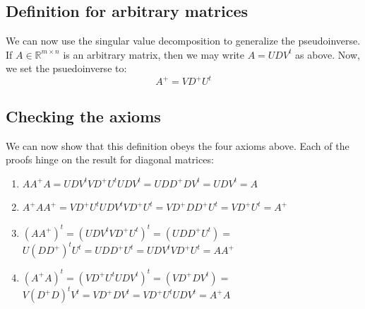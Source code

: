 \documentclass[12pt, a4paper]{article}
\numberwithin{equation}{section}
\begin{document}
\subsection{Definition for arbitrary matrices}
We can now use the singular value decomposition to generalize the pseudoinverse. If $A\in\mathbb{R}^{m\times n}$ is an arbitrary matrix, then we may write $A=UD V^t$ as above. Now, we set the psuedoinverse to:
\begin{equation}
A^+=VD^+ U^t
\end{equation}

\subsection{Checking the axioms}
We can now show that this definition obeys the four axioms above. Each of the proofs hinge on the result for diagonal matrices:
\begin{enumerate}
\item $AA^+ A=UDV^t VD^+ U^t UDV^t=UDD^+ DV^t=UDV^t=A$
\item $A^+ AA^+=VD^+ U^t UDV^t VD^+ U^t=VD^+ DD^+ U^t=VD^+ U^t=A^+$
\item $(AA^+)^t=(UDV^t VD^+ U^t)^t=(UDD^+ U^t)=$ \\
$U(DD^+)^t U^t= UDD^+ U^t=UDV^t VD^+ U^t=AA^+$
\item $(A^+A)^t=(VD^+ U^t UDV^t)^t=(VD^+ DV^t)=$ \\
$V(D^+ D)^t V^t=VD^+ DV^t=VD^+ U^t UDV^t=A^+ A$
\end{enumerate}
\end{document}
